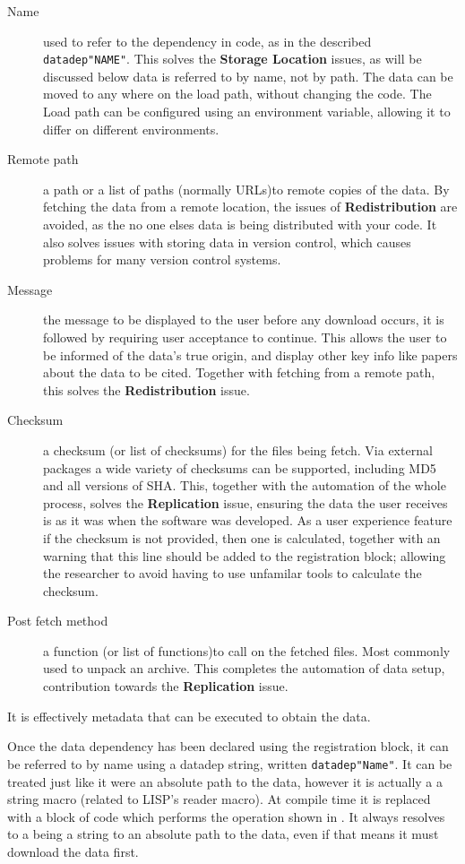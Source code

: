 \documentclass[twoside,11pt]{article}
\newcommand{\datadep}[1]{\texttt{datadep"{}#1"{}}}
\begin{document}
\begin{description}
	\item[Name] used to refer to the dependency in code, as in the described \datadep{NAME}. 
	This solves the \textbf{Storage Location} issues, as will be discussed below data is referred to by name, not by path. The data can be moved to any where on the load path, without changing the code. The Load path can be configured using an environment variable, allowing it to differ on different environments.
	\item[Remote path] a path or a list of paths (normally URLs)to remote copies of the data. By fetching the data from a remote location, the issues of \textbf{Redistribution} are avoided, as the no one elses data is being distributed with your code. It also solves issues with storing data in version control, which causes problems for many version control systems.
	\item[Message] the message to be displayed to the user before any download occurs, it is followed by requiring user acceptance to continue. This allows the user to be informed of the data's true origin, and display other key info like papers about the data to be cited. Together with fetching from a remote path, this solves the \textbf{Redistribution} issue.
	\item[Checksum] a checksum (or list of checksums) for the files being fetch. Via external packages a wide variety of checksums can be supported, including MD5 and all versions of SHA.
	This, together with the automation of the whole process, solves the \textbf{Replication} issue, 
	ensuring the data the user receives is as it was when the software was developed.
	As a user experience feature if the checksum is not provided, then one is calculated, together with an warning that this line should be added to the registration block; allowing the researcher to avoid having to use unfamilar tools to calculate the checksum.
	\item[Post fetch method] a function  (or list of functions)to call on the fetched files. Most commonly used to unpack an archive. This completes the automation of data setup, contribution towards the \textbf{Replication} issue.
\end{description}
\noindent It is effectively metadata that can be executed to obtain the data.


Once the data dependency has been declared using the registration block, it can be referred to by name using a datadep string, written \datadep{Name}.
It can be treated just like it were an absolute path to the data, however it is actually a a string macro (related to LISP's reader macro).
At compile time it is replaced with a block of code which performs the operation shown in .
It always resolves to a being a string to an absolute path to the data, even if that means it must download the data first.
\end{document}
